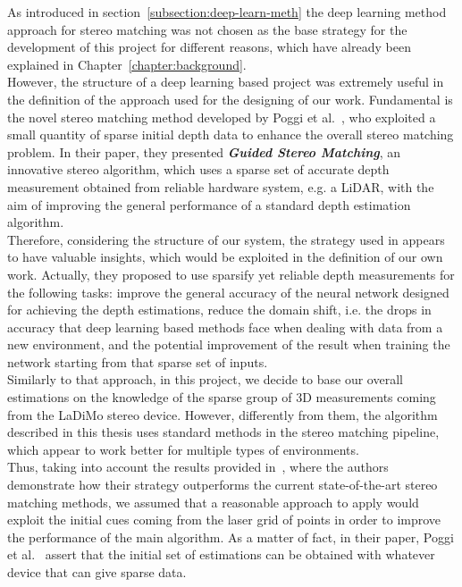As introduced in section~\ref{subsection:deep-learn-meth} the deep learning method approach for stereo matching was not chosen as the base strategy for the development of this project for different reasons, which have already been explained in Chapter~\ref{chapter:background}.\\
However, the structure of a deep learning based project was extremely useful in the definition of the approach used for the designing of our work.
Fundamental is the novel stereo matching method developed by Poggi et al.~\cite{Poggi2019}, who exploited a small quantity of sparse initial depth data to enhance the overall stereo matching problem.
In their paper, they presented \textbf{\textit{Guided Stereo Matching}}, an innovative stereo algorithm, which uses a sparse set of accurate depth measurement obtained from reliable hardware system, e.g. a LiDAR, with the aim of improving the general performance of a standard depth estimation algorithm.\\
Therefore, considering the structure of our system, the strategy used in \cite{Poggi2019} appears to have valuable insights, which would be exploited in the definition of our own work.
Actually, they proposed to use sparsify yet reliable depth measurements for the following tasks: improve the general accuracy of the neural network designed for achieving the depth estimations, reduce the domain shift, i.e. the drops in accuracy that deep learning based methods face when dealing with data from a new environment, and the potential improvement of the result when training the network starting from that sparse set of inputs.\\
Similarly to that approach, in this project, we decide to base our overall estimations on the knowledge of the sparse group of 3D measurements coming from the LaDiMo stereo device.
However, differently from them, the algorithm described in this thesis uses standard methods in the stereo matching pipeline, which appear to work better for multiple types of environments. \\
Thus, taking into account the results provided in~\cite{Poggi2019}, where the authors demonstrate how their strategy outperforms the current state-of-the-art stereo matching methods, we assumed that a reasonable approach to apply would exploit the initial cues coming from the laser grid of points in order to improve the performance of the main algorithm. 
As a matter of fact, in their paper, Poggi et al.~\cite{Poggi2019} assert that the initial set of estimations can be obtained with whatever device that can give sparse data.\\

